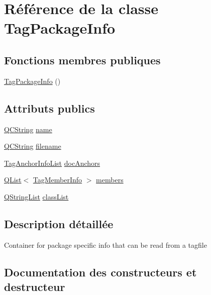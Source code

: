 \hypertarget{class_tag_package_info}{}\section{Référence de la classe Tag\+Package\+Info}
\label{class_tag_package_info}
\subsection*{Fonctions membres publiques}
\begin{DoxyCompactItemize}
\item 
\hyperlink{class_tag_package_info_a0939e7d309254beb954a318d325ef1c2}{Tag\+Package\+Info} ()
\end{DoxyCompactItemize}
\subsection*{Attributs publics}
\begin{DoxyCompactItemize}
\item 
\hyperlink{class_q_c_string}{Q\+C\+String} \hyperlink{class_tag_package_info_a6421c38b37145e1f056b28858a03ed7b}{name}
\item 
\hyperlink{class_q_c_string}{Q\+C\+String} \hyperlink{class_tag_package_info_a33ed62000d0d361828e54115671005c0}{filename}
\item 
\hyperlink{class_tag_anchor_info_list}{Tag\+Anchor\+Info\+List} \hyperlink{class_tag_package_info_ae653734354d08bda1b11ea3512456963}{doc\+Anchors}
\item 
\hyperlink{class_q_list}{Q\+List}$<$ \hyperlink{class_tag_member_info}{Tag\+Member\+Info} $>$ \hyperlink{class_tag_package_info_addf2e409596c0cf34c5740242977677c}{members}
\item 
\hyperlink{class_q_string_list}{Q\+String\+List} \hyperlink{class_tag_package_info_ab2714dccc28aa841b745350bcb945e0c}{class\+List}
\end{DoxyCompactItemize}


\subsection{Description détaillée}
Container for package specific info that can be read from a tagfile 

\subsection{Documentation des constructeurs et destructeur}
\hypertarget{class_tag_package_info_a0939e7d309254beb954a318d325ef1c2}{}
